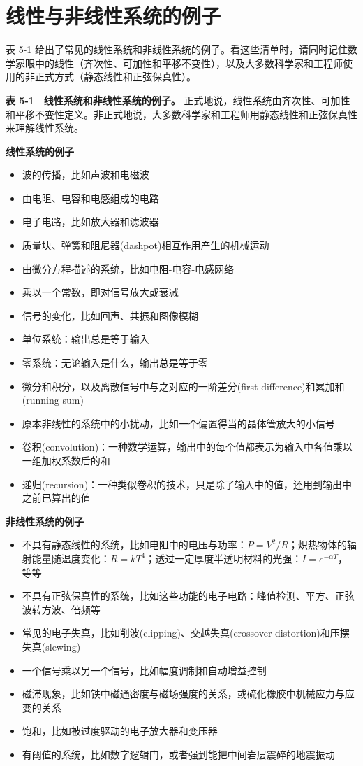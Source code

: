 \section{线性与非线性系统的例子}

表 5-1
给出了常见的线性系统和非线性系统的例子。看这些清单时，请同时记住数学家眼中的线性（齐次性、可加性和平移不变性），以及大多数科学家和工程师使用的非正式方式（静态线性和正弦保真性）。

\textbf{表 5-1　线性系统和非线性系统的例子。}
正式地说，线性系统由齐次性、可加性和平移不变性定义。非正式地说，大多数科学家和工程师用静态线性和正弦保真性来理解线性系统。

\textbf{线性系统的例子}

\begin{itemize}
\tightlist
\item
  波的传播，比如声波和电磁波
\item
  由电阻、电容和电感组成的电路
\item
  电子电路，比如放大器和滤波器
\item
  质量块、弹簧和阻尼器(dashpot)相互作用产生的机械运动
\item
  由微分方程描述的系统，比如电阻-电容-电感网络
\item
  乘以一个常数，即对信号放大或衰减
\item
  信号的变化，比如回声、共振和图像模糊
\item
  单位系统：输出总是等于输入
\item
  零系统：无论输入是什么，输出总是等于零
\item
  微分和积分，以及离散信号中与之对应的一阶差分(first
  difference)和累加和(running sum)
\item
  原本非线性的系统中的小扰动，比如一个偏置得当的晶体管放大的小信号
\item
  卷积(convolution)：一种数学运算，输出中的每个值都表示为输入中各值乘以一组加权系数后的和
\item
  递归(recursion)：一种类似卷积的技术，只是除了输入中的值，还用到输出中之前已算出的值
\end{itemize}

\textbf{非线性系统的例子}

\begin{itemize}
\tightlist
\item
  不具有静态线性的系统，比如电阻中的电压与功率：\(P = V^2/R\)；炽热物体的辐射能量随温度变化：\(R = kT^4\)；透过一定厚度半透明材料的光强：\(I = e^{-\alpha T}\)，等等
\item
  不具有正弦保真性的系统，比如这些功能的电子电路：峰值检测、平方、正弦波转方波、倍频等
\item
  常见的电子失真，比如削波(clipping)、交越失真(crossover
  distortion)和压摆失真(slewing)
\item
  一个信号乘以另一个信号，比如幅度调制和自动增益控制
\item
  磁滞现象，比如铁中磁通密度与磁场强度的关系，或硫化橡胶中机械应力与应变的关系
\item
  饱和，比如被过度驱动的电子放大器和变压器
\item
  有阈值的系统，比如数字逻辑门，或者强到能把中间岩层震碎的地震振动
\end{itemize}

